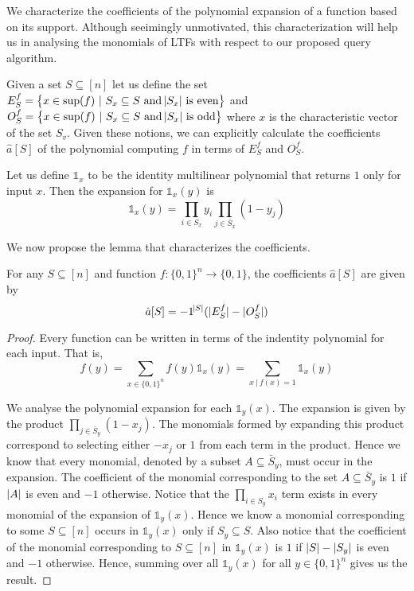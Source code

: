 We characterize the coefficients of the polynomial expansion of a function based on its support. Although seeimingly unmotivated, this characterization will help us in analysing the monomials of LTFs with respect to our proposed query algorithm.

Given a set $S\subseteq [n]$ let us define the set $E^f_S = \set{x\in \sup(f) \ | \ S_x \subseteq S \text{ and $\abs{S_x}$ is even} }$ and $O^f_S = \set{x\in \sup(f) \ | \ S_x \subseteq S \text{ and $\abs{S_x}$ is odd} }$ where $x$ is the characteristic vector of the set $S_v$. Given these notions, we can explicitly calculate the coefficients $\hat{a}[S]$ of the polynomial computing $f$ in terms of $E^f_S$ and $O^f_S$. 

\begin{definition}
	Let us define $\mathds{1}_x$ to be the identity multilinear polynomial that returns $1$ only for input $x$. Then the expansion for $\mathds{1}_x(y)$ is $$\mathds{1}_x(y) = \prod_{i \in S_x} y_i \prod_{j \in \bar{S}_x} (1 - y_j)$$
\end{definition}

We now propose the lemma that characterizes the coefficients. 

\begin{lemma}\label{lemma1}
	For any $S\subseteq [n]$ and function $f: \{0,1\}^n \rightarrow \{0,1\}$, the coefficients $\hat{a}[S]$ are given by 
    \[\hat{a}[S] = -1^{\abs{S}}(\vert E^f_S\vert - \vert O^f_S\vert)\]
	\begin{proof}
		Every function can be written in terms of the indentity polynomial for each input. That is, $$f(y) = \sum_{x \in \{0, 1\}^n} f(y) \mathds{1}_x(y) = \sum_{x \ | \ f(x) = 1} \mathds{1}_x(y)$$

		We analyse the polynomial expansion for each $\mathds{1}_y(x)$. The expansion is given by the product $\prod_{j \in \bar{S}_y} (1 - x_j)$. The monomials formed by expanding this product correspond to selecting either $-x_j$ or $1$ from each term in the product. Hence we know that every monomial, denoted by a subset $A \subseteq \bar{S}_y$, must occur in the expansion. The coefficient of the monomial corresponding to the set $A \subseteq\bar{S}_y$ is $1$ if $\vert A\vert$ is even and $-1$ otherwise. Notice that the $\prod_{i \in S_y} x_i$ term exists in every monomial of the expansion of $\mathds{1}_y(x)$. Hence we know a monomial corresponding to some $S \subseteq [n]$ occurs in $\mathds{1}_y(x)$ only if $S_y \subseteq S$. Also notice that the coefficient of the monomial corresponding to $S \subseteq [n]$ in $\mathds{1}_y(x)$ is $1$ if $\vert S\vert - \vert S_y\vert$ is even and $-1$ otherwise. Hence, summing over all $\mathds{1}_y(x)$ for all $y \in \{0,1\}^n$ gives us the result. 

	\end{proof}
\end{lemma} 
